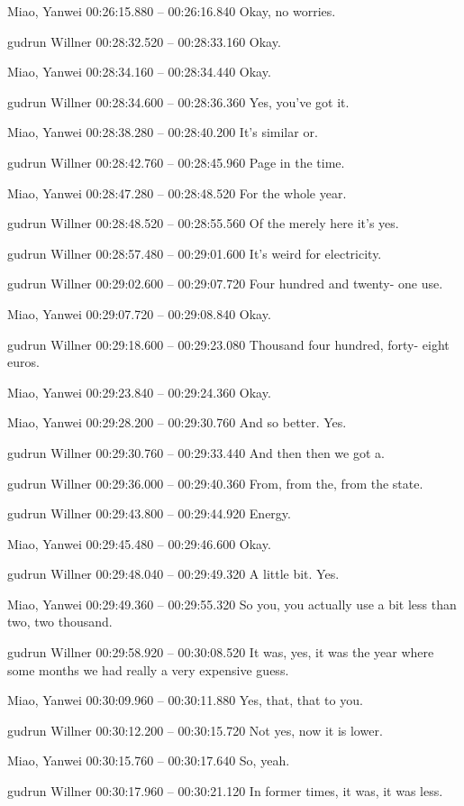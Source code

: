 {Miao, Yanwei 00:26:15.880 -- 00:26:16.840
Okay, no worries.

gudrun Willner 00:28:32.520 -- 00:28:33.160
Okay.

Miao, Yanwei 00:28:34.160 -- 00:28:34.440
Okay.

gudrun Willner 00:28:34.600 -- 00:28:36.360
Yes, you've got it.

Miao, Yanwei 00:28:38.280 -- 00:28:40.200
It's similar or.

gudrun Willner 00:28:42.760 -- 00:28:45.960
Page in the time.

Miao, Yanwei 00:28:47.280 -- 00:28:48.520
For the whole year.

gudrun Willner 00:28:48.520 -- 00:28:55.560
Of the merely here it's yes.

gudrun Willner 00:28:57.480 -- 00:29:01.600
It's weird for electricity.

gudrun Willner 00:29:02.600 -- 00:29:07.720
Four hundred and twenty- one use.

Miao, Yanwei 00:29:07.720 -- 00:29:08.840
Okay.

gudrun Willner 00:29:18.600 -- 00:29:23.080
Thousand four hundred, forty- eight euros.

Miao, Yanwei 00:29:23.840 -- 00:29:24.360
Okay.

Miao, Yanwei 00:29:28.200 -- 00:29:30.760
And so better. Yes.

gudrun Willner 00:29:30.760 -- 00:29:33.440
And then then we got a.

gudrun Willner 00:29:36.000 -- 00:29:40.360
From, from the, from the state.

gudrun Willner 00:29:43.800 -- 00:29:44.920
Energy.

Miao, Yanwei 00:29:45.480 -- 00:29:46.600
Okay.

gudrun Willner 00:29:48.040 -- 00:29:49.320
A little bit. Yes.

Miao, Yanwei 00:29:49.360 -- 00:29:55.320
So you, you actually use a bit less than two, two thousand.

gudrun Willner 00:29:58.920 -- 00:30:08.520
It was, yes, it was the year where some months we had really a very expensive guess.

Miao, Yanwei 00:30:09.960 -- 00:30:11.880
Yes, that, that to you.

gudrun Willner 00:30:12.200 -- 00:30:15.720
Not yes, now it is lower.

Miao, Yanwei 00:30:15.760 -- 00:30:17.640
So, yeah.

gudrun Willner 00:30:17.960 -- 00:30:21.120
In former times, it was, it was less.

}
